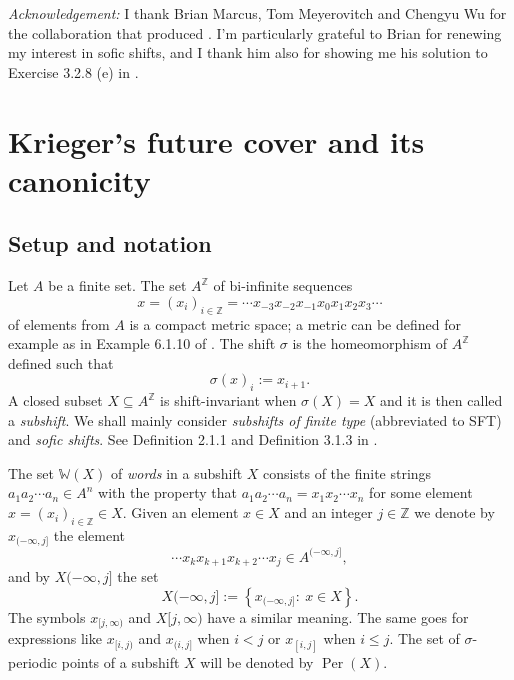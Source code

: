 \documentclass[12pt,oneside,english]{amsart}
\newcommand{\Per}{\operatorname{Per}}
\begin{document}
 

\bigskip

{\em Acknowledgement:} I thank Brian Marcus, Tom Meyerovitch and Chengyu Wu for the collaboration that produced \cite{MMTW}. I'm particularly grateful to Brian for renewing my interest in sofic shifts, and I thank him also for showing me his solution to Exercise 3.2.8 (e) in \cite{LM}.
 
\section{Krieger's future cover and its canonicity}



\subsection{Setup and notation} 

Let $A$ be a finite set. The set $A^\mathbb Z$ of bi-infinite sequences 
$$
x = (x_i)_{i \in \mathbb Z} = \cdots x_{-3}x_{-2}x_{-1}x_0x_1x_2x_3 \cdots
$$
of elements from $A$ is a compact metric space; a metric can be defined for example as in Example 6.1.10 of \cite{LM}. The shift $\sigma$ is the homeomorphism of $A^\mathbb Z$ defined such that
$$
\sigma(x)_i := x_{i+1}.
$$
A closed subset $X \subseteq A^\mathbb Z$ is shift-invariant when $\sigma(X) = X$ and it is then called a \emph{subshift}. We shall mainly consider \emph{subshifts of finite type} (abbreviated to SFT) and \emph{sofic shifts}. See Definition 2.1.1 and Definition 3.1.3 in \cite{LM}. 




The set $\mathbb W(X)$ of \emph{words} in a subshift $X$ consists of the finite strings $a_1a_2 \cdots a_n \in A^n$ with the property that $a_1a_2 \cdots a_n  = x_1x_2\cdots x_n$ for some element $x = (x_i)_{i \in \mathbb Z} \in X$. Given an element $x \in X$ and an integer $j \in \mathbb Z$ we denote by $x_{(-\infty,j]}$ the element 
$$
\cdots x_{k}x_{k+1} x_{k+2} \cdots x_j \in A^{(-\infty,j]},
$$
and by $X(-\infty,j]$ the set
$$
X(-\infty,j] := \left\{ x_{(-\infty,j]}: \ x \in X \right\}.
$$
The symbols $x_{[j,\infty)}$ and $X[j,\infty)$ have a similar meaning. The same goes for expressions like $x_{[i,j)}$ and $x_{(i,j]}$ when $i < j$ or $x_{[i,j]}$ when $i \leq j$. The set of $\sigma$-periodic points of a subshift $X$ will be denoted by $\Per(X)$.
\end{document}
